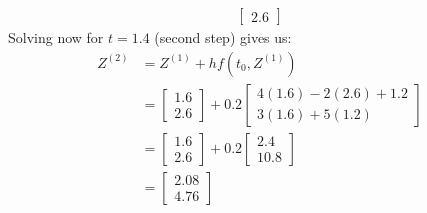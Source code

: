 \documentclass[12pt]{article}
\begin{document}
\begin{adjustwidth}{0em}{0pt}
\begin{align*}
\begin{bmatrix}
2.6
\end{bmatrix}
\end{align*}
Solving now for $t = 1.4$ (second step) gives us:
\begin{align*} 
	Z^{(2)} &= Z^{(1)} + hf(t_0, Z^{(1)}) \\
	        &= \begin{bmatrix}
1.6\\
2.6
\end{bmatrix} + 0.2\begin{bmatrix}
4(1.6) - 2(2.6) + 1.2\\
3(1.6) + 5(1.2) 
\end{bmatrix} \\
	        &= \begin{bmatrix}
1.6\\
2.6
\end{bmatrix} + 0.2\begin{bmatrix}
2.4\\
10.8
\end{bmatrix} \\
	        &= \begin{bmatrix}
2.08\\
4.76
\end{bmatrix}
\end{align*}
\end{adjustwidth}
\end{document}
